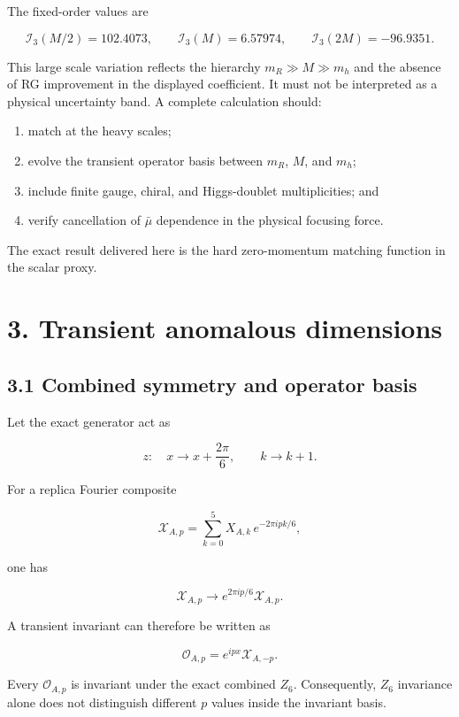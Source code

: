 \documentclass[
  10pt,
]{article}
\providecommand{\tightlist}{%
  \setlength{\itemsep}{0pt}\setlength{\parskip}{0pt}}
\begin{document}
The fixed-order values are

\[
\mathcal I_3(M/2)=102.4073,
\qquad
\mathcal I_3(M)=6.57974,
\qquad
\mathcal I_3(2M)=-96.9351.
\]

This large scale variation reflects the hierarchy \(m_R\gg M\gg m_h\)
and the absence of RG improvement in the displayed coefficient. It must
not be interpreted as a physical uncertainty band. A complete
calculation should:

\begin{enumerate}
\def\labelenumi{\arabic{enumi}.}
\tightlist
\item
  match at the heavy scales;
\item
  evolve the transient operator basis between \(m_R\), \(M\), and
  \(m_h\);
\item
  include finite gauge, chiral, and Higgs-doublet multiplicities; and
\item
  verify cancellation of \(\bar\mu\) dependence in the physical focusing
  force.
\end{enumerate}

The exact result delivered here is the hard zero-momentum matching
function in the scalar proxy.

\section{3. Transient anomalous
dimensions}\label{transient-anomalous-dimensions}

\subsection{3.1 Combined symmetry and operator
basis}\label{combined-symmetry-and-operator-basis}

Let the exact generator act as

\[
z:
\quad
x\to x+\frac{2\pi}{6},
\qquad
k\to k+1.
\]

For a replica Fourier composite

\[
\mathcal X_{A,p}
=
\sum_{k=0}^{5}
X_{A,k}\,e^{-2\pi ipk/6},
\]

one has

\[
\mathcal X_{A,p}\to e^{2\pi ip/6}\mathcal X_{A,p}.
\]

A transient invariant can therefore be written as

\[
\mathcal O_{A,p}
=
e^{ipx}\mathcal X_{A,-p}.
\]

Every \(\mathcal O_{A,p}\) is invariant under the exact combined
\(Z_6\). Consequently, \(Z_6\) invariance alone does not distinguish
different \(p\) values inside the invariant basis.
\end{document}
